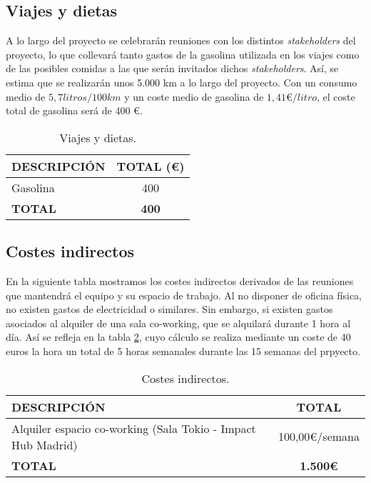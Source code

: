 \subsection{Viajes y dietas}
\par A lo largo del proyecto se celebrarán reuniones con los distintos \textit{stakeholders} del proyecto, lo que collevará tanto gastos de la gasolina utilizada en los viajes como de las posibles comidas a las que serán invitados dichos \textit{stakeholders}. Así, se estima que se realizarán unos 5.000 km a lo largo del proyecto. Con un consumo medio de $5,7 litros /100km$ y un coste medio de gasolina de $1,41 \euro/litro$, el coste total de gasolina será de 400 \euro.

\begin{table}[H]
\begin{center}
\begin{tabular}{l c}
\textbf{DESCRIPCIÓN} & \textbf{TOTAL (\euro)}\\ \hline \hline
Gasolina & 400\\
\textbf{TOTAL} & \textbf{400}\\ \hline
\end{tabular}
\caption{Viajes y dietas.}
\label{tab:viajes}
\end{center}
\end{table}


\subsection{Costes indirectos}
En la siguiente tabla mostramos los costes indirectos derivados de las reuniones que mantendrá el equipo y su espacio de trabajo. Al no disponer de oficina física, no existen gastos de electricidad o similares. Sin embargo, si existen gastos asociados al alquiler de una sala co-working, que se alquilará durante 1 hora al día. Así se refleja en la tabla \ref{tab:indirectos}, cuyo cálculo se realiza mediante un coste de 40 euros la hora un total de 5 horas semanales durante las 15 semanas del prpyecto.

\begin{table}[H]
\begin{center}
\begin{tabular}{l c}
\textbf{DESCRIPCIÓN} & \textbf{TOTAL}\\ \hline \hline
Alquiler espacio co-working (Sala Tokio - Impact Hub Madrid) & 100,00\euro/semana\\ \hline \hline
\textbf{TOTAL} & \textbf{1.500\euro}\\ \hline
\end{tabular}
\caption{Costes indirectos.}
\label{tab:indirectos}
\end{center}
\end{table}

